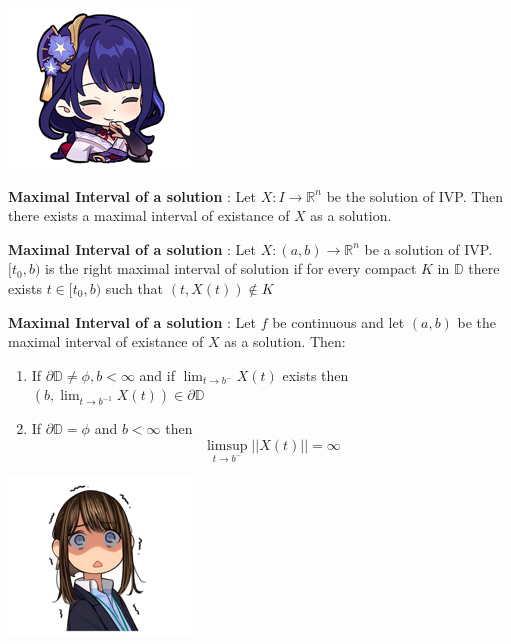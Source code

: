 \documentclass{tufte-book}
\begin{document}
\begin{marginfigure}
	\includegraphics{3.png}
\end{marginfigure}

\begin{tcolorbox}[colback=blue!8!white]
	\textbf{Maximal Interval of a solution }: Let $X:I\to\mathbb R^n$ be the solution of IVP. Then there exists a maximal interval of existance of $X$ as a solution.
\end{tcolorbox}


\begin{tcolorbox}[colback=blue!8!white]
	\textbf{Maximal Interval of a solution }: Let $X:(a,b)\to\mathbb{R}^n$ be a solution of IVP. $[t_0,b)$ is the right maximal interval of solution if for every compact $K$ in $\mathbb D$ there exists $t\in[t_0,b)$ such that $(t,X(t))\notin K$
\end{tcolorbox}

\begin{tcolorbox}[colback=blue!8!white]
	\textbf{Maximal Interval of a solution }: Let $f$ be continuous and let $(a,b)$ be the maximal interval of existance of $X$ as a solution. Then:
	\begin{enumerate}
		\item If $\partial \mathbb D\ne\phi,b<\infty$ and if $\lim_{t\to b^{-}}X(t)$ exists then $(b,\lim_{t\to b^{-1}}X(t))\in\partial \mathbb D$
		\item If $\partial \mathbb D=\phi$ and $b<\infty$ then $$\limsup_{t\to b^{-}}||X(t)||=\infty$$
	\end{enumerate}
\end{tcolorbox}


\begin{marginfigure}
	\includegraphics{4.png}
\end{marginfigure}
\end{document}
